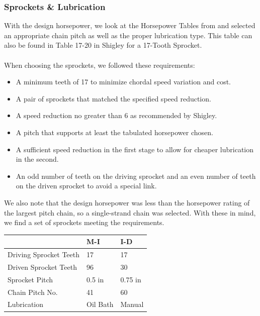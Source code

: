 \documentclass[letterpaper,12pt]{article}
\begin{document}
\subsubsection{Sprockets \& Lubrication}
With the design horsepower, we look at the Horsepower Tables from \cite{martin} and selected an appropriate chain pitch as well as the proper lubrication type. This table can also be found in Table 17-20 in Shigley for a 17-Tooth Sprocket.
\\\\
When choosing the sprockets, we followed these requirements:
\begin{itemize}
    \itemsep0em
    \item A minimum teeth of 17 to minimize chordal speed variation and cost.
    \item A pair of sprockets that matched the specified speed reduction.
    \item A speed reduction no greater than 6 as recommended by Shigley.
    \item A pitch that supports at least the tabulated horsepower chosen.
    \item A sufficient speed reduction in the first stage to allow for cheaper lubrication in the second.
    \item An odd number of teeth on the driving sprocket and an even number of teeth on the driven sprocket to avoid a special link.
\end{itemize}
We also note that the design horsepower was less than the horsepower rating of the largest pitch chain, so a single-strand chain was selected. With these in mind, we find a set of sprockets meeting the requirements.
\begin{center}
	\begin{tabular}{|p{4cm}|p{1.5cm}|p{1.5cm}| }
		\hline
		& M-I & I-D \\
		\hline
		Driving Sprocket Teeth & 17 & 17\\
		Driven Sprocket Teeth & 96 & 30\\
		Sprocket Pitch & 0.5 in & 0.75 in\\
		Chain Pitch No. & 41 & 60 \\
		Lubrication & Oil Bath & Manual \\
		\hline
	\end{tabular}
\end{center}
\end{document}
